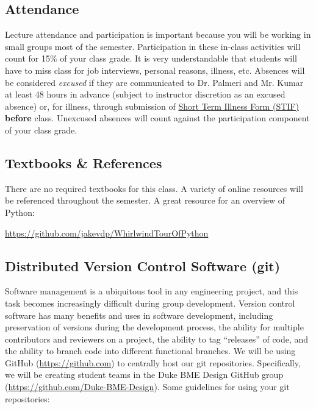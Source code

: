 \subsection*{Attendance}
Lecture attendance and participation is important because you will be working in small groups most of the semester.  Participation in these in-class activities will count for 15\% of
your class grade.  It is very understandable that students will have to miss
class for job interviews, personal reasons, illness, etc.  Absences will
be considered \emph{excused} if they are communicated to Dr. Palmeri and Mr. Kumar at least
48 hours in advance (subject to instructor discretion as an excused absence) or, for illness, through submission of
\href{http://www.pratt.duke.edu/undergrad/policies/3531}{Short Term Illness
    Form (STIF)} {\bf before} class.  Unexcused absences will count
against the participation component of your class grade.  

\subsection*{Textbooks \& References} 
There are no required textbooks for this class.  A variety of online resources will be referenced throughout the semester.  A great resource for an overview of Python:\\
\centerline{\url{https://github.com/jakevdp/WhirlwindTourOfPython}}

\subsection*{Distributed Version Control Software (git)} 
Software management is a ubiquitous tool in any engineering
project, and this task becomes increasingly difficult during group development.
Version control software has many benefits and uses in software development,
including preservation of versions during the development process, the ability
for multiple contributors and reviewers on a project, the ability to tag
``releases'' of code, and the ability to branch code into different functional
branches.  We will be using GitHub (\url{https://github.com}) to
centrally host our git repositories.  Specifically, we will be creating student teams in the Duke BME Design GitHub group (\url{https://github.com/Duke-BME-Design}).  Some guidelines for using your git repositories:

